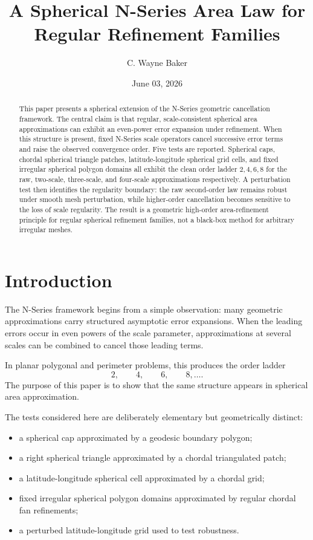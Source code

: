 \documentclass[11pt]{article}
\title{A Spherical N-Series Area Law for Regular Refinement Families}
\author{C. Wayne Baker}
\date{June 03, 2026}
\begin{document}
\maketitle

\begin{abstract}
This paper presents a spherical extension of the N-Series geometric
cancellation framework.  The central claim is that regular, scale-consistent
spherical area approximations can exhibit an even-power error expansion under
refinement.  When this structure is present, fixed N-Series scale operators
cancel successive error terms and raise the observed convergence order.  Five
tests are reported.  Spherical caps, chordal spherical triangle patches,
latitude-longitude spherical grid cells, and fixed irregular spherical
polygon domains all exhibit the clean order ladder $2,4,6,8$ for the raw,
two-scale, three-scale, and four-scale approximations respectively.  A
perturbation test then identifies the regularity boundary: the raw
second-order law remains robust under smooth mesh perturbation, while
higher-order cancellation becomes sensitive to the loss of scale regularity.
The result is a geometric high-order area-refinement principle for regular
spherical refinement families, not a black-box method for arbitrary irregular
meshes.
\end{abstract}

\section{Introduction}

The N-Series framework begins from a simple observation: many geometric
approximations carry structured asymptotic error expansions.  When the
leading errors occur in even powers of the scale parameter, approximations at
several scales can be combined to cancel those leading terms.

In planar polygonal and perimeter problems, this produces the order ladder
\[
  2,\qquad 4,\qquad 6,\qquad 8,\ldots .
\]
The purpose of this paper is to show that the same structure appears in
spherical area approximation.

The tests considered here are deliberately elementary but geometrically
distinct:

\begin{itemize}
\item a spherical cap approximated by a geodesic boundary polygon;
\item a right spherical triangle approximated by a chordal triangulated patch;
\item a latitude-longitude spherical cell approximated by a chordal grid;
\item fixed irregular spherical polygon domains approximated by regular
      chordal fan refinements;
\item a perturbed latitude-longitude grid used to test robustness.
\end{itemize}
\end{document}
